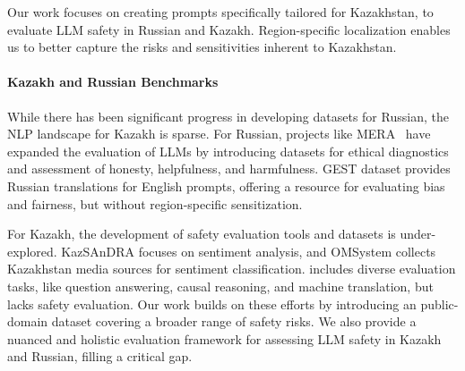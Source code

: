 Our work focuses on creating prompts specifically tailored for Kazakhstan, to evaluate LLM safety in Russian and Kazakh. 
Region-specific localization enables us to better capture the risks and sensitivities inherent to Kazakhstan. %


\paragraph{Kazakh and Russian Benchmarks}
While there has been significant progress in developing datasets for Russian, the NLP landscape for Kazakh is sparse. For Russian, projects like MERA~\cite{MERA} have expanded the evaluation of LLMs by introducing datasets for ethical diagnostics and assessment of honesty, helpfulness, and harmfulness. GEST dataset \cite{ruGender} provides Russian translations for English prompts, offering a resource for evaluating bias and fairness, but without region-specific sensitization.

For Kazakh, the development of safety evaluation tools and datasets is under-explored. 
KazSAnDRA \cite{yeshpanov-varol-2024-kazsandra} focuses on sentiment analysis, and OMSystem \cite{article} collects Kazakhstan media sources for sentiment classification. %
\cite{maxutov-etal-2024-llms} includes diverse evaluation tasks, like question answering, causal reasoning, and machine translation, but lacks safety evaluation.
% 
Our work builds on these efforts by introducing an public-domain dataset covering a broader range of safety risks. We also provide a nuanced and holistic evaluation framework for assessing LLM safety in Kazakh and Russian, filling a critical gap. %

